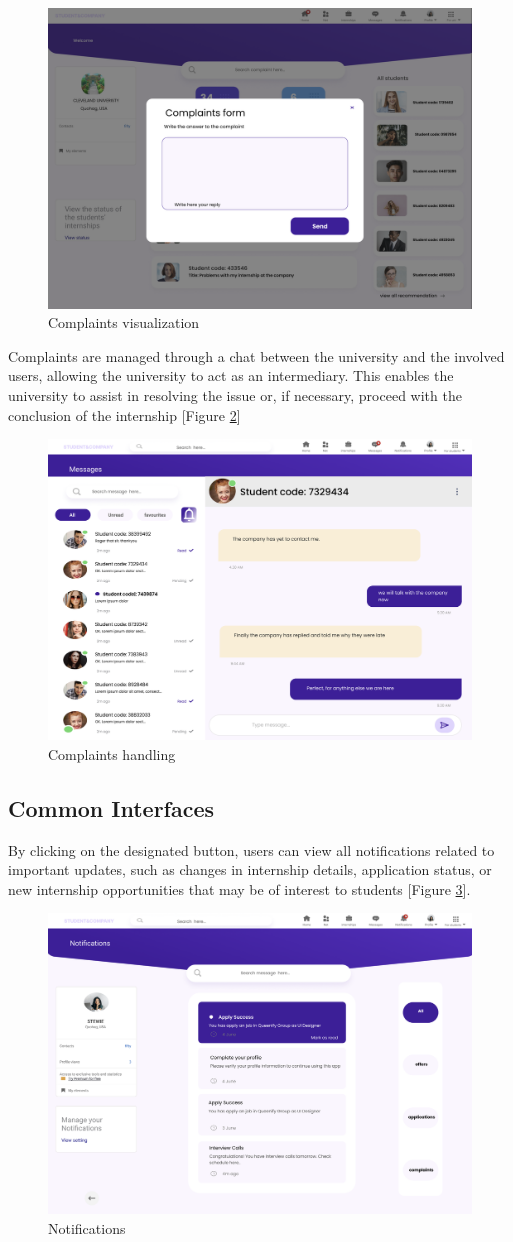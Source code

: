 \begin{figure} [H]
    \centering
    \includegraphics[width=0.5\linewidth]{Images/Interface Images/university interface/Screenshot 2024-12-12 050002.png}
    \caption{Complaints visualization}
    \label{fig:Complaints visualization}
\end{figure}


Complaints are managed through a chat between the university and the involved users, allowing the university to act as an intermediary. This enables the university to assist in resolving the issue or, if necessary, proceed with the conclusion of the internship [Figure \ref{fig: Complaints handling}]

\begin{figure} [H]
    \centering
    \includegraphics[width=0.5\linewidth]{Images/Interface Images/university interface/Screenshot 2024-12-12 050017.png}
    \caption{Complaints handling}
    \label{fig: Complaints handling}
\end{figure}

\subsection{Common Interfaces}

By clicking on the designated button, users can view all notifications related to important updates, such as changes in internship details, application status, or new internship opportunities that may be of interest to students [Figure \ref{fig:Notifications}].

\begin{figure} [H]
    \centering
    \includegraphics[width=0.5\linewidth]{Images/Interface Images/user interface/Screenshot 2024-12-12 045804.png}
    \caption{Notifications}
    \label{fig:Notifications}
\end{figure}


